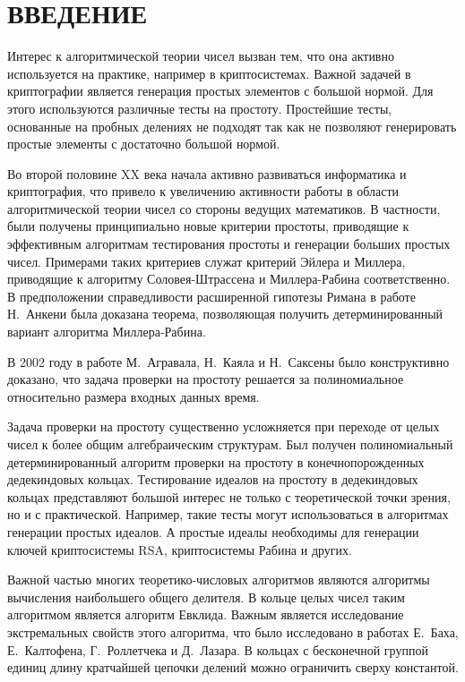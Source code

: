 \documentclass[_00_autoref.tex]{subfiles}
\begin{document}
\chapter*{\MakeUppercase{Введение}\vspace{-2ex}}

Интерес к алгоритмической теории чисел вызван тем, что она активно используется на практике, например в криптосистемах.
Важной задачей в криптографии является генерация простых элементов с большой нормой.
Для этого используются различные тесты на простоту.
Простейшие тесты, основанные на пробных делениях не подходят так как не позволяют генерировать простые элементы с достаточно большой нормой.

Во второй половине XX века начала активно развиваться информатика и криптография, что привело к увеличению активности работы в области алгоритмической теории чисел со стороны ведущих математиков.
В частности, были получены принципиально новые критерии простоты, приводящие к эффективным алгоритмам тестирования простоты и генерации больших простых чисел.
Примерами таких критериев служат критерий Эйлера и Миллера, приводящие к алгоритму Соловея-Штрассена и Миллера-Рабина соответственно.
В предположении справедливости расширенной гипотезы Римана в работе Н.~Анкени была доказана теорема, позволяющая получить детерминированный вариант алгоритма Миллера-Рабина.

В 2002 году в работе М.~Агравала, Н.~Каяла и Н.~Саксены было конструктивно доказано, что задача проверки на простоту решается за полиномиальное относительно размера входных данных время.

Задача проверки на простоту существенно усложняется при переходе от целых чисел к более общим алгебраическим структурам.
Был получен полиномиальный детерминированный алгоритм проверки на простоту в конечнопорожденных дедекиндовых кольцах.
Тестирование идеалов на простоту в дедекиндовых кольцах представляют большой интерес не только с теоретической точки зрения, но и с практической.
Например, такие тесты могут использоваться в алгоритмах генерации простых идеалов.
А простые идеалы необходимы для генерации ключей криптосистемы RSA, криптосистемы Рабина и других.

Важной частью многих теоретико-числовых алгоритмов являются алгоритмы вычисления наибольшего общего делителя.
В кольце целых чисел таким алгоритмом является алгоритм Евклида.
Важным является исследование экстремальных свойств этого алгоритма, что было исследовано в работах Е.~Баха, Е.~Калтофена, Г.~Роллетчека и Д.~Лазара.
В кольцах с бесконечной группой единиц длину кратчайшей цепочки делений можно ограничить сверху константой.
\end{document}
